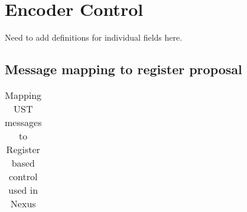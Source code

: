 \chapter{Encoder Control} \label{encoderControl}

Need to add definitions for individual fields here.

\section{Message mapping to register proposal} \label{sec:messageToRegiser}

\begin{table}[htp]
  \tiny
  \centering
  \caption{Mapping UST messages to Register based control used in Nexus}
  \label{tab:te_control}
  \begin{tabulary}{\textwidth}{|l|l|p{15mm}|l|p{10mm}|l|p{15mm}|p{15mm}}


\end{tabulary}
\end{table}
